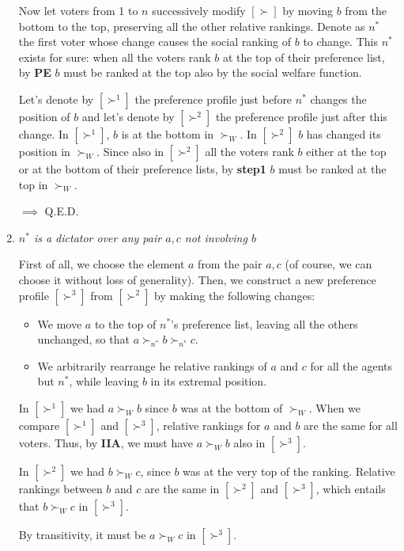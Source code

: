 \begin{enumerate}
	\noindent Now let voters from 1 to $n$ successively modify $[\succ]$ by 
	moving $b$ from the bottom to the top, preserving all the other relative 
	rankings. Denote as $n^*$ the first voter whose change causes the social 
	ranking of $b$ to change. This $n^*$ exists for sure: when all the voters 
	rank $b$ at the top of their preference list, by \textbf{PE} $b$ must be 
	ranked at the top also by the social welfare function.

	\noindent Let's denote by $[\succ^1]$ the preference profile just before 
	$n^*$ changes the position of $b$ and let's denote by $[\succ^2]$ the 
	preference profile just after this change. In $[\succ^1]$, $b$ is at the 
	bottom in $\succ_W$. In $[\succ^2]$ $b$ has changed its position in 
	$\succ_W$. Since also in $[\succ^2]$ all the voters rank $b$ either at the 
	top or at the bottom of their preference lists, by \textbf{step1} $b$ must 
	be ranked at the top in $\succ_W$.

	\noindent $\implies$ Q.E.D.

	\item \textit{$n^*$ is a dictator over any pair $a,c$ not involving $b$}

	\noindent First of all, we choose the element $a$ from the pair $a,c$ (of 
	course, we can choose it without loss of generality). Then, we construct a 
	new preference profile $[\succ^3]$ from $[\succ^2]$ by making the following 
	changes:
	\begin{itemize}
		\item We move $a$ to the top of $n^*$'s preference list, leaving all 
		the others unchanged, so that $a \succ_{n^*} b \succ_{n^*} c$.
		\item We arbitrarily rearrange he relative rankings of $a$ and $c$ for 
		all the agents but $n^*$, while leaving $b$ in its extremal position.
	\end{itemize}
	In $[\succ^1]$ we had $a \succ_W b$ since $b$ was at the bottom of 
	$\succ_W$. When we compare $[\succ^1]$ and $[\succ^3]$, relative rankings 
	for $a$ and $b$ are the same for all voters. Thus, by \textbf{IIA}, we must 
	have $a \succ_W b$ also in $[\succ^3]$.

	\noindent In $[\succ^2]$ we had $b \succ_W c$, since $b$ was at the very top 
	of the ranking. Relative rankings between $b$ and $c$ are the same in 
	$[\succ^2]$ and $[\succ^3]$, which entails that $b \succ_W c$ in $[\succ^3]$.

	\noindent By transitivity, it must be $a \succ_W c$ in $[\succ^3]$.


\end{enumerate}
